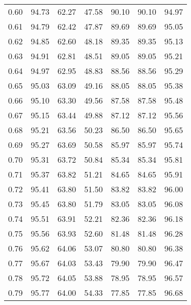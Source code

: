 \begin{tabular}{|c|c|c|c|c|c|c|}
      0.60 &     94.73 &     62.27 &      47.58 &   90.10 &      90.10 &         94.97 \\
      0.61 &     94.79 &     62.42 &      47.87 &   89.69 &      89.69 &         95.05 \\
      0.62 &     94.85 &     62.60 &      48.18 &   89.35 &      89.35 &         95.13 \\
      0.63 &     94.91 &     62.81 &      48.51 &   89.05 &      89.05 &         95.21 \\
      0.64 &     94.97 &     62.95 &      48.83 &   88.56 &      88.56 &         95.29 \\
      0.65 &     95.03 &     63.09 &      49.16 &   88.05 &      88.05 &         95.38 \\
      0.66 &     95.10 &     63.30 &      49.56 &   87.58 &      87.58 &         95.48 \\
      0.67 &     95.15 &     63.44 &      49.88 &   87.12 &      87.12 &         95.56 \\
      0.68 &     95.21 &     63.56 &      50.23 &   86.50 &      86.50 &         95.65 \\
      0.69 &     95.27 &     63.69 &      50.58 &   85.97 &      85.97 &         95.74 \\
      0.70 &     95.31 &     63.72 &      50.84 &   85.34 &      85.34 &         95.81 \\
      0.71 &     95.37 &     63.82 &      51.21 &   84.65 &      84.65 &         95.91 \\
      0.72 &     95.41 &     63.80 &      51.50 &   83.82 &      83.82 &         96.00 \\
      0.73 &     95.45 &     63.80 &      51.79 &   83.05 &      83.05 &         96.08 \\
      0.74 &     95.51 &     63.91 &      52.21 &   82.36 &      82.36 &         96.18 \\
      0.75 &     95.56 &     63.93 &      52.60 &   81.48 &      81.48 &         96.28 \\
      0.76 &     95.62 &     64.06 &      53.07 &   80.80 &      80.80 &         96.38 \\
      0.77 &     95.67 &     64.03 &      53.43 &   79.90 &      79.90 &         96.47 \\
      0.78 &     95.72 &     64.05 &      53.88 &   78.95 &      78.95 &         96.57 \\
      0.79 &     95.77 &     64.00 &      54.33 &   77.85 &      77.85 &         96.68 \\

\end{tabular}
